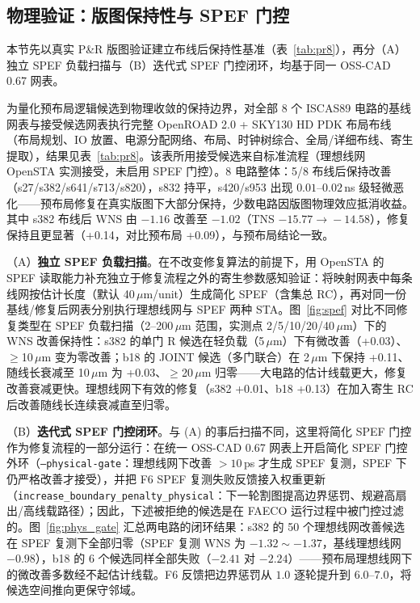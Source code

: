 \documentclass[journal]{IEEEtran}
\begin{document}
\subsection{物理验证：版图保持性与 SPEF 门控}\label{sec:phys_closure}

本节先以真实 P\&R 版图验证建立布线后保持性基准（表~\ref{tab:pr8}），再分（A）独立 SPEF 负载扫描与（B）迭代式 SPEF 门控闭环，均基于同一 OSS-CAD 0.67 网表。

为量化预布局逻辑候选到物理收敛的保持边界，对全部 8 个 ISCAS89 电路的基线网表与接受候选网表执行完整 OpenROAD 2.0 + SKY130 HD PDK 布局布线（布局规划、IO 放置、电源分配网络、布局、时钟树综合、全局/详细布线、寄生提取），结果见表~\ref{tab:pr8}。该表所用接受候选来自标准流程（理想线网 OpenSTA 实测接受，未启用 SPEF 门控）。8 电路整体：5/8 布线后保持改善（s27/s382/s641/s713/s820），s832 持平，s420/s953 出现 $0.01$--$0.02\,$ns 级轻微恶化——预布局修复在真实版图下大部分保持，少数电路因版图物理效应抵消收益。其中 s382 布线后 WNS 由 $-1.16$ 改善至 $-1.02$（TNS $-15.77\!\rightarrow\!-14.58$），修复保持且更显著（+0.14，对比预布局 +0.09），与预布局结论一致。

（A）\textbf{独立 SPEF 负载扫描}。在不改变修复算法的前提下，用 OpenSTA 的 SPEF 读取能力补充独立于修复流程之外的寄生参数感知验证：将映射网表中每条线网按估计长度（默认 40\,$\mu$m/unit）生成简化 SPEF（含集总 RC），再对同一份基线/修复后网表分别执行理想线网与 SPEF 两种 STA。图~\ref{fig:spef} 对比不同修复类型在 SPEF 负载扫描（2--200\,$\mu$m 范围，实测点 2/5/10/20/40\,$\mu$m）下的 WNS 改善保持性：s382 的单门 R 候选在轻负载（5\,$\mu$m）下有微改善（+0.03）、$\ge$10\,$\mu$m 变为零改善；b18 的 JOINT 候选（多门联合）在 2\,$\mu$m 下保持 +0.11、随线长衰减至 10\,$\mu$m 为 +0.03、$\ge$20\,$\mu$m 归零——大电路的估计线载更大，修复改善衰减更快。理想线网下有效的修复（s382 +0.01、b18 +0.13）在加入寄生 RC 后改善随线长连续衰减直至归零。

（B）\textbf{迭代式 SPEF 门控闭环}。与 (A) 的事后扫描不同，这里将简化 SPEF 门控作为修复流程的一部分运行：在统一 OSS-CAD 0.67 网表上开启简化 SPEF 门控外环（\texttt{--physical-gate}：理想线网下改善 $>10\,$ps 才生成 SPEF 复测，SPEF 下仍严格改善才接受），并把 F6 SPEF 复测失败反馈接入权重更新（\texttt{increase\_boundary\_penalty\_physical}：下一轮割图提高边界惩罚、规避高扇出/高线载路径）；因此，下述被拒绝的候选是在 FAECO 运行过程中被门控过滤的。图~\ref{fig:phys_gate} 汇总两电路的闭环结果：s382 的 50 个理想线网改善候选在 SPEF 复测下全部归零（SPEF 复测 WNS 为 $-1.32\sim-1.37$，基线理想线网 $-0.98$），b18 的 6 个候选同样全部失败（$-2.41$ 对 $-2.24$）——预布局理想线网下的微改善多数经不起估计线载。F6 反馈把边界惩罚从 $1.0$ 逐轮提升到 $6.0$--$7.0$，将候选空间推向更保守邻域。
\end{document}
